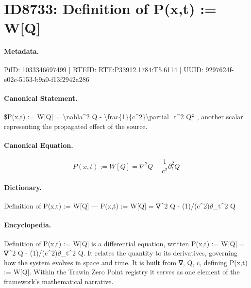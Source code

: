 \section*{ID8733: Definition of P(x,t) := W[Q]}
\paragraph{Metadata.}
PiID: 1033346697499 | RTEID: RTE:P33912.1784:T5.6114 | UUID: 9297624f-e02c-5153-b9a0-f13f2942a286

\paragraph{Canonical Statement.}
\$P(x,t) := W[Q] = \textbackslash{}nabla\textasciicircum{}2 Q - \textbackslash{}frac\{1\}\{c\textasciicircum{}2\}\textbackslash{}partial\_t\textasciicircum{}2 Q\$ , another scalar representing the propagated effect of the source.

\paragraph{Canonical Equation.}
\[
P(x,t) := W[Q] = \nabla^2 Q - \frac{1}{c^2}\partial_t^2 Q
\]

\paragraph{Dictionary.}
Definition of P(x,t) := W[Q] — P(x,t) := W[Q] = ∇\textasciicircum{}2 Q - (1)/(c\textasciicircum{}2)∂\_t\textasciicircum{}2 Q

\paragraph{Encyclopedia.}
Definition of P(x,t) := W[Q] is a differential equation, written P(x,t) := W[Q] = ∇\textasciicircum{}2 Q - (1)/(c\textasciicircum{}2)∂\_t\textasciicircum{}2 Q. It relates the quantity to its derivatives, governing how the system evolves in space and time. It is built from ∇, Q, c, defining P(x,t) := W[Q]. Within the Trawin Zero Point registry it serves as one element of the framework's mathematical narrative.
